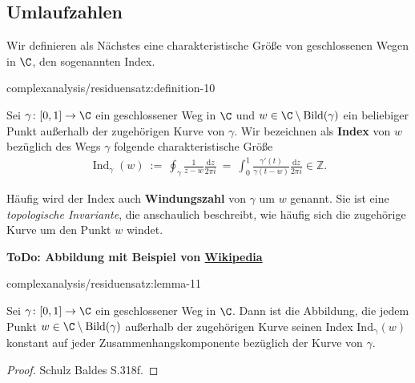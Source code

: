 \documentclass[letterpaper,10pt,german]{jupyterBook}
\begin{document}
\subsection{Umlaufzahlen}
\label{\detokenize{complexanalysis/residuensatz:umlaufzahlen}}
\par
Wir definieren als Nächstes eine charakteristische Größe von geschlossenen Wegen in \(\C\), den sogenannten Index.
\begin{definition}{}{complexanalysis/residuensatz:definition-10}



\par
Sei \(\gamma \colon [0,1] \rightarrow \C\) ein geschlossener Weg in \(\C\) und \(w \in \C \setminus \operatorname{Bild}(\gamma)\) ein beliebiger Punkt außerhalb der zugehörigen Kurve von \(\gamma\).
Wir bezeichnen als \textbf{Index} von \(w\) bezüglich des Wegs \(\gamma\) folgende charakteristische Größe
\begin{align*}
\operatorname{Ind}_\gamma(w) \ := \ \oint_\gamma \frac{1}{z - w} \frac{\mathrm{d}z}{2\pi i} \ = \ \int_0^1 \frac{\gamma'(t)}{\gamma(t - w)} \frac{\mathrm{d}z}{2\pi i} \in \mathbb{Z}.
\end{align*}
\par
Häufig wird der Index auch \textbf{Windungszahl} von \(\gamma\) um \(w\) genannt.
Sie ist eine \emph{topologische Invariante}, die anschaulich beschreibt, wie häufig sich die zugehörige Kurve um den Punkt \(w\) windet.
\end{definition}

\par
\textbf{ToDo: Abbildung mit Beispiel von \href{https://de.wikipedia.org/wiki/Umlaufzahl\_(Mathematik)}{Wikipedia}}
\begin{lemma}{}{complexanalysis/residuensatz:lemma-11}



\par
Sei \(\gamma \colon [0,1] \rightarrow \C\) ein geschlossener Weg in \(\C\).
Dann ist die Abbildung, die jedem Punkt \(w \in \C \setminus \operatorname{Bild}(\gamma)\) außerhalb der zugehörigen Kurve seinen Index \(\operatorname{Ind_\gamma}(w)\) konstant auf jeder Zusammenhangskomponente bezüglich der Kurve von \(\gamma\).
\end{lemma}

\begin{proof}
 Schulz Baldes S.318f.
\end{proof}
\end{document}

